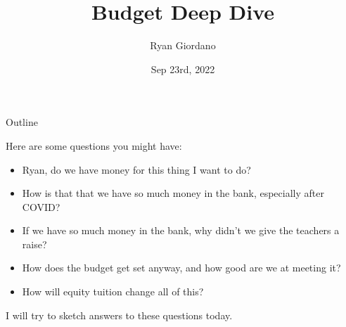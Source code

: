 \documentclass[8pt]{beamer}
\title{Budget Deep Dive}
\author{Ryan Giordano}
\date{Sep 23rd, 2022}
\institute{Children's Community Center}
\begin{document}

\begin{frame}{Outline}

Here are some questions you might have:
%
\begin{itemize}
%
\item Ryan, do we have money for this thing I want to do?
\item How is that that we have so much money in the bank, especially after COVID?
\item If we have so much money in the bank, why didn't we give the teachers
    a raise?
\item How does the budget get set anyway, and how good are we at meeting it?
\item How will equity tuition change all of this?
%
\end{itemize}
%
I will try to sketch answers to these questions today.
%
\end{frame}

\end{document}

